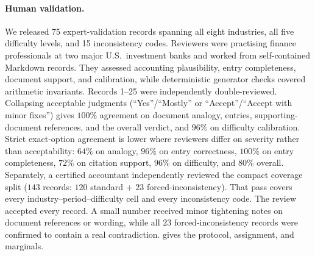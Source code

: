 \paragraph{Human validation.}
\label{sec:human-validation}
We released 75 expert-validation records spanning all eight industries, all five difficulty levels, and 15 inconsistency codes. Reviewers were practising finance professionals at two major U.S.\ investment banks and worked from self-contained Markdown records. They assessed accounting plausibility, entry completeness, document support, and calibration, while deterministic generator checks covered arithmetic invariants. Records 1--25 were independently double-reviewed. Collapsing acceptable judgments (``Yes''/``Mostly'' or ``Accept''/``Accept with minor fixes'') gives $100\%$ agreement on document analogy, entries, supporting-document references, and the overall verdict, and $96\%$ on difficulty calibration. Strict exact-option agreement is lower where reviewers differ on severity rather than acceptability: $64\%$ on analogy, $96\%$ on entry correctness, $100\%$ on entry completeness, $72\%$ on citation support, $96\%$ on difficulty, and $80\%$ overall. Separately, a certified accountant independently reviewed the compact coverage split ($143$ records: $120$ standard + $23$ forced-inconsistency). That pass covers every industry--period--difficulty cell and every inconsistency code. The review accepted every record. A small number received minor tightening notes on document references or wording, while all $23$ forced-inconsistency records were confirmed to contain a real contradiction.  gives the protocol, assignment, and marginals.

